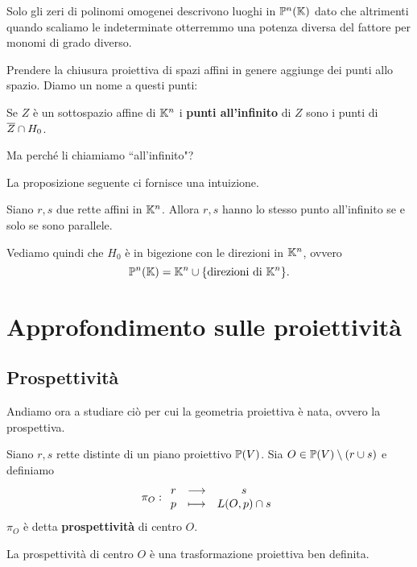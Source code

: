 \begin{multicols*}{2}
    \begin{remark}
    Solo gli zeri di polinomi omogenei descrivono luoghi in $\mathbb{P}^n(\mathbb{K})$ dato che altrimenti quando scaliamo le indeterminate otterremmo una potenza diversa del fattore per monomi di grado diverso.
    \end{remark}

    \noindent Prendere la chiusura proiettiva di spazi affini in genere aggiunge dei punti allo spazio. Diamo un nome a questi punti:

    \begin{definition}
    Se $Z$ \`e un sottospazio affine di $\mathbb{K}^n$ i \textbf{punti all'infinito} di $Z$ sono i punti di $\overline{Z}\cap H_0$.
    \end{definition}


    \begin{center}
    Ma perch\'e li chiamiamo ``all'infinito"?
    \end{center}
    La proposizione seguente ci fornisce una intuizione.
    \begin{proposition}
    Siano $r,s$ due rette affini in $\mathbb{K}^n$. Allora $r,s$ hanno lo stesso punto all'infinito se e solo se sono parallele.
    \end{proposition}

    Vediamo quindi che $H_0$ \`e in bigezione con le direzioni in $\mathbb{K}^n$, ovvero
    \[\mathbb{P}^n(\mathbb{K})=\mathbb{K}^n\cup\{\text{direzioni di }\mathbb{K}^n\}.\]


    \section{Approfondimento sulle proiettivit\`a}
    \subsection{Prospettivit\`a}
    Andiamo ora a studiare ci\`o per cui la geometria proiettiva \`e nata, ovvero la prospettiva.

    \begin{definition}[Prospettivit\`a]
    Siano $r,s$ rette distinte di un piano proiettivo ${\mathbb{P}(V)}$. Sia $O\in{\mathbb{P}(V)}\setminus(r\cup s)$ e definiamo
    \[\pi_O:\begin{array}{ccc} {r} & \longrightarrow & {s}\\ {p} & \longmapsto & {L(O,p)\cap s} \end{array}\]
    $\pi_O$ \`e detta \textbf{prospettivit\`a} di centro $O$.
    \end{definition}

    \begin{proposition}
    La prospettivit\`a di centro $O$ \`e una trasformazione proiettiva ben definita.
    \end{proposition}


\end{multicols*}
